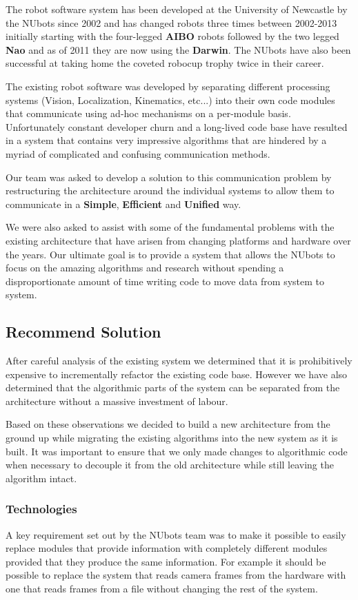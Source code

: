 \documentclass[english,12pt]{scrartcl}
\begin{document}
			The robot software system has been developed at the University of Newcastle by the NUbots since 2002 and has changed robots three times between 2002-2013 initially starting with the four-legged \textbf{AIBO} robots followed by the two legged \textbf{Nao} and as of 2011 they are now using the \textbf{Darwin}. The NUbots have also been successful at taking home the coveted robocup trophy twice in their career.
			
			The existing robot software was developed by separating different processing systems (Vision, Localization, Kinematics, etc...) into their own code modules that communicate using ad-hoc mechanisms on a per-module basis. 
			Unfortunately constant developer churn and a long-lived code base have resulted in a system that contains very impressive algorithms that are hindered by a myriad of complicated and confusing communication methods.
			
			Our team was asked to develop a solution to this communication problem by restructuring the architecture around the individual systems to allow them to communicate in a \textbf{Simple}, \textbf{Efficient} and \textbf{Unified} way. 
			
			We were also asked to assist with some of the fundamental problems with the existing architecture that have arisen from changing platforms and hardware over the years. 
			Our ultimate goal is to provide a system that allows the NUbots to focus on the amazing algorithms and research without spending a disproportionate amount of time writing code to move data from system to system.
				
		\subsection{Recommend Solution}
			After careful analysis of the existing system we determined that it is prohibitively expensive to incrementally refactor the existing code base. However we have also determined that the algorithmic parts of the system can be separated from the architecture without a massive investment of labour. 
			
			Based on these observations we decided to build a new architecture from the ground up while migrating the existing algorithms into the new system as it is built. It was important to ensure that we only made changes to algorithmic code when necessary to decouple it from the old architecture while still leaving the algorithm intact.
			
			\subsubsection{Technologies}
				A key requirement set out by the NUbots team was to make it possible to easily replace modules that provide information with completely different modules provided that they produce the same information. 
				For example it should be possible to replace the system that reads camera frames from the hardware with one that reads frames from a file without changing the rest of the system.
				
\end{document}
